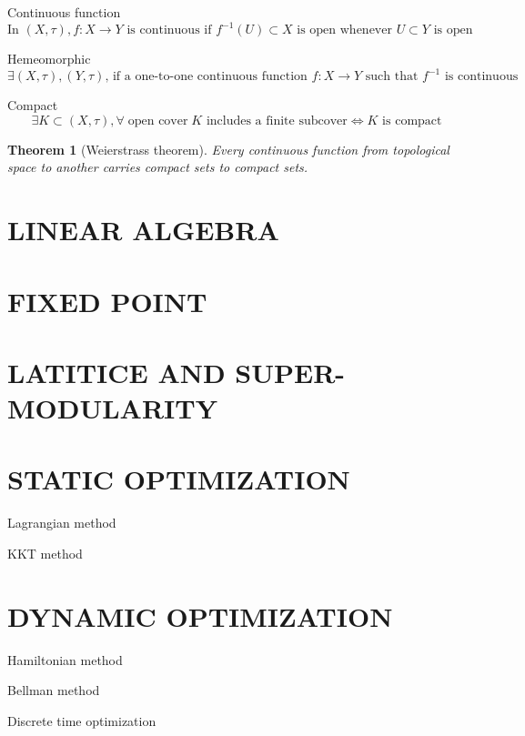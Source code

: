 \documentclass{article}
\newtheorem{theorem}{Theorem}
\begin{document}
Continuous function
$$\text{In }(X,\tau),f:X \rightarrow Y \text{ is continuous if } f^{-1}(U)\subset X \text{ is open whenever } U\subset Y \text{ is open}$$

Hemeomorphic
$$\exists (X,\tau),(Y,\tau)\text{, if a one-to-one continuous function } f:X \rightarrow Y \text{ such that } f^{-1} \text{ is continuous}$$

Compact
$$\exists K \subset (X,\tau),\forall \; \text{open cover}\; K \text{ includes a finite subcover} \iff K \text{ is compact}$$

\begin{theorem}[Weierstrass theorem]
Every continuous function from topological space to another carries compact sets to compact sets.
\end{theorem}


























\newpage
\section{LINEAR ALGEBRA}

\newpage
\section{FIXED POINT}

\newpage
\section{LATITICE AND SUPER-MODULARITY}

\newpage
\section{STATIC OPTIMIZATION}

Lagrangian method

KKT method

\newpage
\section{DYNAMIC OPTIMIZATION}

Hamiltonian method

Bellman method

Discrete time optimization
\end{document}
